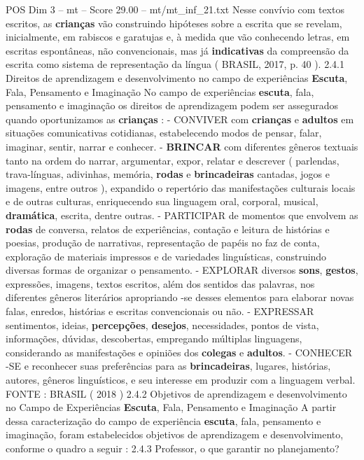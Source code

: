 \begin{textsample}{POS Dim 3 – mt – Score 29.00 – mt/mt\_inf\_21.txt}
Nesse convívio com textos escritos, as \textbf{crianças} vão construindo hipóteses sobre a escrita que se revelam, inicialmente, em rabiscos e garatujas e, à medida que vão conhecendo letras, em escritas espontâneas, não convencionais, mas já \textbf{indicativas} da compreensão da escrita como sistema de representação da língua ( BRASIL, 2017, p. 40 ). 2.4.1 Direitos de aprendizagem e desenvolvimento no campo de experiências \textbf{Escuta}, Fala, Pensamento e Imaginação No campo de experiências \textbf{escuta}, fala, pensamento e imaginação os direitos de aprendizagem podem ser assegurados quando oportunizamos as \textbf{crianças} : - CONVIVER com \textbf{crianças} e \textbf{adultos} em situações comunicativas cotidianas, estabelecendo modos de pensar, falar, imaginar, sentir, narrar e conhecer. - \textbf{BRINCAR} com diferentes gêneros textuais tanto na ordem do narrar, argumentar, expor, relatar e descrever ( parlendas, trava-línguas, adivinhas, memória, \textbf{rodas} e \textbf{brincadeiras} cantadas, jogos e imagens, entre outros ), expandido o repertório das manifestações culturais locais e de outras culturas, enriquecendo sua linguagem oral, corporal, musical, \textbf{dramática}, escrita, dentre outras. - PARTICIPAR de momentos que envolvem as \textbf{rodas} de conversa, relatos de experiências, contação e leitura de histórias e poesias, produção de narrativas, representação de papéis no faz de conta, exploração de materiais impressos e de variedades linguísticas, construindo diversas formas de organizar o pensamento. - EXPLORAR diversos \textbf{sons}, \textbf{gestos}, expressões, imagens, textos escritos, além dos sentidos das palavras, nos diferentes gêneros literários apropriando -se desses elementos para elaborar novas falas, enredos, histórias e escritas convencionais ou não. - EXPRESSAR sentimentos, ideias, \textbf{percepções}, \textbf{desejos}, necessidades, pontos de vista, informações, dúvidas, descobertas, empregando múltiplas linguagens, considerando as manifestações e opiniões dos \textbf{colegas} e \textbf{adultos}. - CONHECER -SE e reconhecer suas preferências para as \textbf{brincadeiras}, lugares, histórias, autores, gêneros linguísticos, e seu interesse em produzir com a linguagem verbal.
FONTE : BRASIL ( 2018 ) 2.4.2 Objetivos de aprendizagem e desenvolvimento no Campo de Experiências \textbf{Escuta}, Fala, Pensamento e Imaginação A partir dessa caracterização do campo de experiência \textbf{escuta}, fala, pensamento e imaginação, foram estabelecidos objetivos de aprendizagem e desenvolvimento, conforme o quadro a seguir : 2.4.3 Professor, o que garantir no planejamento?

\end{textsample}
